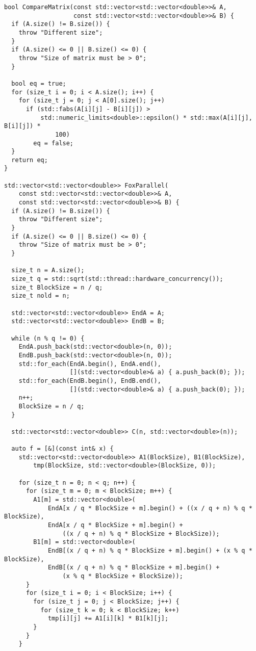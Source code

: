 \documentclass[12pt]{article}
\begin{document}
\begin{lstlisting}
bool CompareMatrix(const std::vector<std::vector<double>>& A,
                   const std::vector<std::vector<double>>& B) {
  if (A.size() != B.size()) {
    throw "Different size";
  }
  if (A.size() <= 0 || B.size() <= 0) {
    throw "Size of matrix must be > 0";
  }

  bool eq = true;
  for (size_t i = 0; i < A.size(); i++) {
    for (size_t j = 0; j < A[0].size(); j++)
      if (std::fabs(A[i][j] - B[i][j]) >
          std::numeric_limits<double>::epsilon() * std::max(A[i][j], B[i][j]) *
              100)
        eq = false;
  }
  return eq;
}

std::vector<std::vector<double>> FoxParallel(
    const std::vector<std::vector<double>>& A,
    const std::vector<std::vector<double>>& B) {
  if (A.size() != B.size()) {
    throw "Different size";
  }
  if (A.size() <= 0 || B.size() <= 0) {
    throw "Size of matrix must be > 0";
  }

  size_t n = A.size();
  size_t q = std::sqrt(std::thread::hardware_concurrency());
  size_t BlockSize = n / q;
  size_t nold = n;

  std::vector<std::vector<double>> EndA = A;
  std::vector<std::vector<double>> EndB = B;

  while (n % q != 0) {
    EndA.push_back(std::vector<double>(n, 0));
    EndB.push_back(std::vector<double>(n, 0));
    std::for_each(EndA.begin(), EndA.end(),
                  [](std::vector<double>& a) { a.push_back(0); });
    std::for_each(EndB.begin(), EndB.end(),
                  [](std::vector<double>& a) { a.push_back(0); });
    n++;
    BlockSize = n / q;
  }

  std::vector<std::vector<double>> C(n, std::vector<double>(n));

  auto f = [&](const int& x) {
    std::vector<std::vector<double>> A1(BlockSize), B1(BlockSize),
        tmp(BlockSize, std::vector<double>(BlockSize, 0));

    for (size_t n = 0; n < q; n++) {
      for (size_t m = 0; m < BlockSize; m++) {
        A1[m] = std::vector<double>(
            EndA[x / q * BlockSize + m].begin() + ((x / q + n) % q * BlockSize),
            EndA[x / q * BlockSize + m].begin() +
                ((x / q + n) % q * BlockSize + BlockSize));
        B1[m] = std::vector<double>(
            EndB[(x / q + n) % q * BlockSize + m].begin() + (x % q * BlockSize),
            EndB[(x / q + n) % q * BlockSize + m].begin() +
                (x % q * BlockSize + BlockSize));
      }
      for (size_t i = 0; i < BlockSize; i++) {
        for (size_t j = 0; j < BlockSize; j++) {
          for (size_t k = 0; k < BlockSize; k++)
            tmp[i][j] += A1[i][k] * B1[k][j];
        }
      }
    }


\end{lstlisting}
\end{document}
